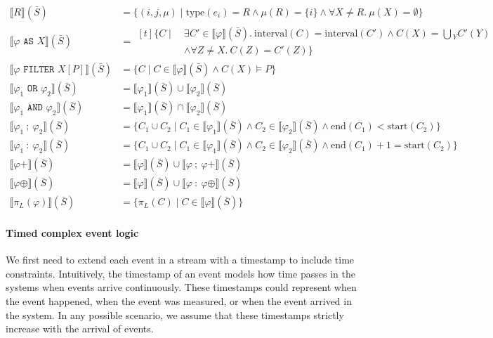 \begin{align*}
    \llbracket R\rrbracket(\bar{S}) &=
    \{(i,j,\mu) \mid \text{type}(e_i)=R \wedge \mu(R)=\{i\} \wedge \forall X\neq R.\ \mu(X) = \emptyset \} \\
    \llbracket \varphi \texttt{ AS } X\rrbracket(\bar{S}) &= 
    \begin{aligned}[t]
        \{ C \mid\ &\exists C' \in \llbracket \varphi \rrbracket(\bar{S}).\ \text{interval}(C)=\text{interval}(C') \wedge C(X)=\bigcup{_Y} C'(Y)  \\
        &\wedge \forall Z\neq X.\ C(Z)=C'(Z) \}
    \end{aligned} \\
    \llbracket \varphi \texttt{ FILTER } X[P]\rrbracket(\bar{S}) &= 
    \{C \mid C \in \llbracket\varphi\rrbracket(\bar{S}) \wedge C(X) \vDash P \} \\ 
    \llbracket \varphi_1 \texttt{ OR } \varphi_2 \rrbracket(\bar{S}) &= \llbracket\varphi_1\rrbracket(\bar{S}) \cup \llbracket\varphi_2\rrbracket(\bar{S}) \\
    \llbracket \varphi_1 \texttt{ AND } \varphi_2 \rrbracket(\bar{S}) &= \llbracket\varphi_1\rrbracket(\bar{S}) \cap \llbracket\varphi_2\rrbracket(\bar{S}) \\ 
    \llbracket \varphi_1\ ;\ \varphi_2 \rrbracket(\bar{S}) &= \{C_1 \cup C_2 \mid 
    C_1 \in \llbracket\varphi_1\rrbracket(\bar{S}) \wedge C_2 \in \llbracket\varphi_2\rrbracket(\bar{S}) \wedge \text{end}(C_1) < \text{start}(C_2) \} \\ 
    \llbracket \varphi_1\ :\ \varphi_2 \rrbracket(\bar{S}) &= \{C_1 \cup C_2 \mid 
    C_1 \in \llbracket\varphi_1\rrbracket(\bar{S}) \wedge C_2 \in \llbracket\varphi_2\rrbracket(\bar{S}) \wedge \text{end}(C_1) + 1 = \text{start}(C_2) \} \\ 
    \llbracket\varphi+\rrbracket(\bar{S}) &= \llbracket\varphi\rrbracket(\bar{S}) \cup \llbracket\varphi\ ;\ \varphi+  \rrbracket(\bar{S}) \\
    \llbracket\varphi\oplus\rrbracket(\bar{S}) &= \llbracket\varphi\rrbracket(\bar{S}) \cup \llbracket\varphi\ :\ \varphi\oplus \rrbracket(\bar{S}) \\ 
    \llbracket\pi_L(\varphi)\rrbracket(\bar{S}) &= 
    \{\pi_L(C) \mid C\in \llbracket\varphi\rrbracket(\bar{S})\}
\end{align*}

\paragraph{Timed complex event logic}
We first need to extend each event in a stream with a timestamp to include time constraints. 
Intuitively, the timestamp of an event models how time passes in the systems when events arrive continuously.
These timestamps could represent when the event happened, when the event was measured, or when the event arrived in the system.
In any possible scenario, we assume that these timestamps strictly increase with the arrival of events.

